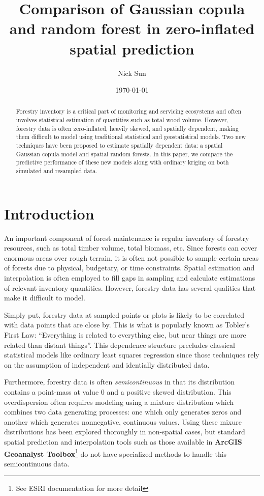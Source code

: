 \documentclass{article}
\title{Comparison of Gaussian copula and random forest in zero-inflated spatial prediction}
\date{\today}
\author{Nick Sun}
\begin{document}
\maketitle

\begin{abstract}
	Forestry inventory is a critical part of monitoring and servicing ecosystems and often involves statistical estimation of quantities such as total wood volume.
	However, forestry data is often zero-inflated, heavily skewed, and spatially dependent, making them difficult to model using traditional statistical and geostatistical models.
	Two new techniques have been proposed to estimate spatially dependent data: a spatial Gaussian copula model and spatial random forests.
	In this paper, we compare the predictive performance of these new models along with ordinary kriging on both simulated and resampled data.
\end{abstract}

\section{Introduction}
An important component of forest maintenance is regular inventory of forestry resources, such as total timber volume, total biomass, etc.
Since forests can cover enormous areas over rough terrain, it is often not possible to sample certain areas of forests due to physical, budgetary, or time constraints.
Spatial estimation and interpolation is often employed to fill gaps in sampling and calculate estimations of relevant inventory quantities.
However, forestry data has several qualities that make it difficult to model.

Simply put, forestry data at sampled points or plots is likely to be correlated with data points that are close by.
This is what is popularly known as Tobler's First Law: ``Everything is related to everything else, but near things are more related than distant things''\cite{miller04}.
This dependence structure precludes classical statistical models like ordinary least squares regression since those techniques rely on the assumption of independent and identially distributed data.

Furthermore, forestry data is often \textit{semicontinuous} in that its distribution contains a point-mass at value 0 and a positive skewed distribution\cite{mills13}.
This overdispersion often requires modeling using a mixture distribution which combines two data generating processes: one which only generates zeros and another which generates nonnegative, continuous values.
Using these mixure distributions has been explored thoroughly in non-spatial cases, but standard spatial prediction and interpolation tools such as those available in \textbf{ArcGIS Geoanalyst Toolbox}\footnote{See ESRI documentation for more detail} do not have specialized methods to handle this semicontinuous data.
\end{document}
